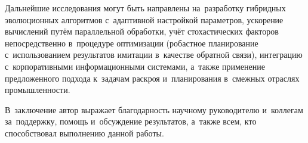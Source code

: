 Дальнейшие исследования могут быть направлены на~разработку гибридных эволюционных алгоритмов с~адаптивной настройкой параметров, ускорение вычислений путём параллельной обработки, учёт стохастических факторов непосредственно в~процедуре оптимизации (робастное планирование с~использованием результатов имитации в~качестве обратной связи), интеграцию с~корпоративными информационными системами, а~также применение предложенного подхода к~задачам раскроя и~планирования в~смежных отраслях промышленности.

В~заключение автор выражает благодарность научному руководителю и~коллегам за~поддержку, помощь и~обсуждение результатов, а~также всем, кто способствовал выполнению данной работы. 